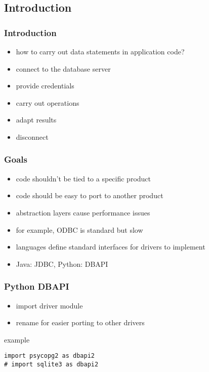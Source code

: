 \documentclass[dvipsnames]{beamer}
\theoremstyle{plain}
\begin{document}
\subsection{Introduction}

\begin{frame}
  \frametitle{Introduction}

  \begin{itemize}
    \item how to carry out data statements in application code?

    \bigskip
    \item connect to the database server
    \item provide credentials

    \medskip
    \item carry out operations
    \item adapt results

    \medskip
    \item disconnect
  \end{itemize}
\end{frame}

\begin{frame}
  \frametitle{Goals}

  \begin{itemize}
    \item code shouldn't be tied to a specific product
    \item code should be easy to port to another product

    \medskip
    \item abstraction layers cause performance issues
    \item for example, ODBC is standard but slow

    \pause
    \bigskip
    \item languages define standard interfaces for drivers to implement
    \item Java: JDBC, Python: DBAPI
  \end{itemize}
\end{frame}

\begin{frame}[fragile]
  \frametitle{Python DBAPI}

  \begin{itemize}
    \item import driver module
    \item rename for easier porting to other drivers
  \end{itemize}

  \begin{exampleblock}{example}
    \begin{lstlisting}
import psycopg2 as dbapi2
# import sqlite3 as dbapi2
    \end{lstlisting}
  \end{exampleblock}
\end{frame}
\end{document}
